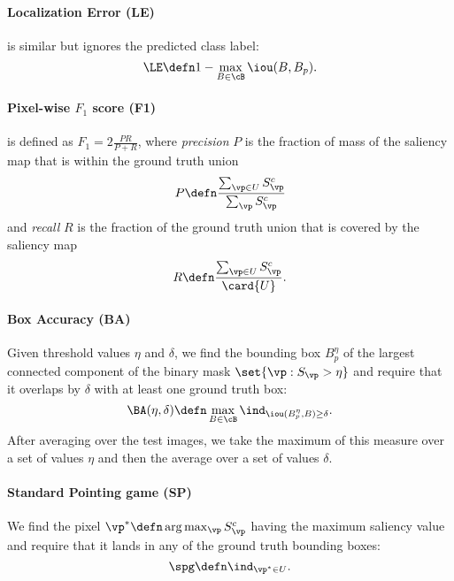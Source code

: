 \paragraph{Localization Error (LE)}

is similar but ignores the predicted class label:
\begin{equation}
	\LE \defn 1 - \max_{B \in \cB} \iou(B, B_p).
\label{eq:le}
\end{equation}

\paragraph{Pixel-wise $F_1$ score (F1)}

is defined as $F_1 = 2 \frac{P R}{P + R}$, where \emph{precision} $P$ is the fraction of mass of the saliency map that is within the ground truth union
\begin{equation}
	P \defn \frac{\sum_{\vp \in U} S^c_{\vp}}{\sum_{\vp} S^c_{\vp}}
\label{eq:prec}
\end{equation}
and \emph{recall} $R$ is the fraction of the ground truth union that is covered by the saliency map
\begin{equation}
	R \defn \frac{\sum_{\vp \in U} S^c_{\vp}}{\card{U}}.
\label{eq:rec}
\end{equation}

\paragraph{Box Accuracy (BA)~\citep{choe2020evaluating}}

Given threshold values $\eta$ and $\delta$, we find the bounding box $B^\eta_p$ of the largest connected component of the binary mask $\set{\vp: S_{\vp} > \eta}$ and require that it overlaps by $\delta$ with at least one ground truth box:
\begin{equation}
	\BA(\eta, \delta) \defn \max_{B \in \cB} \ind_{\iou(B^\eta_p, B) \ge \delta}.
\label{eq:ba}
\end{equation}
After averaging over the test images, we take the maximum of this measure over a set of values $\eta$ and then the average over a set of values $\delta$.

\paragraph{Standard Pointing game (SP)~\cite{zhang2018top}}

We find the pixel $\vp^* \defn \arg\max_{\vp} S^c_{\vp}$ having the maximum saliency value and require that it lands in any of the ground truth bounding boxes:
\begin{equation}
	\spg \defn \ind_{\vp^* \in U}.
\label{eq:spg}
\end{equation}

